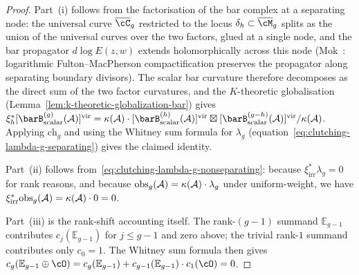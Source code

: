 \begin{proof}
Part~(i) follows from the factorisation of the bar complex at a
separating node: the universal curve $\overline{\cC}_g$ restricted
to the locus $\delta_h \subset \overline{\cM}_g$ splits as the
union of the universal curves over the two factors, glued at a
single node, and the bar propagator $d\!\log E(z,w)$ extends
holomorphically across this node
(Mok~\cite{Mok25}: logarithmic Fulton--MacPherson compactification
preserves the propagator along separating boundary divisors). The
scalar bar curvature therefore decomposes as the direct sum of the
two factor curvatures, and the $K$-theoretic globalisation
(Lemma~\ref{lem:k-theoretic-globalization-bar}) gives
$\xi_h^*[\barB^{(g)}_{\mathrm{scalar}}(\cA)]^{\mathrm{vir}}
= \kappa(\cA)\cdot[\barB^{(h)}_{\mathrm{scalar}}(\cA)]^{\mathrm{vir}}
\boxtimes
[\barB^{(g-h)}_{\mathrm{scalar}}(\cA)]^{\mathrm{vir}}/\kappa(\cA)$.
Applying $\mathrm{ch}_g$ and using the Whitney sum formula for
$\lambda_g$ (equation~\eqref{eq:clutching-lambda-g-separating}) gives the
claimed identity.

Part~(ii) follows from~\eqref{eq:clutching-lambda-g-nonseparating}: because
$\xi_{\mathrm{irr}}^*\lambda_g = 0$ for rank reasons, and because
$\mathrm{obs}_g(\mathcal{A}) = \kappa(\mathcal{A})\cdot\lambda_g$ under
uniform-weight, we have
$\xi_{\mathrm{irr}}^*\mathrm{obs}_g(\mathcal{A}) = \kappa(\mathcal{A})\cdot 0 = 0$.

Part~(iii) is the rank-shift accounting itself. The rank-$(g-1)$
summand $\mathbb{E}_{g-1}$ contributes
$c_j(\mathbb{E}_{g-1})$ for $j \leq g-1$ and zero above; the trivial
rank-$1$ summand contributes only $c_0 = 1$. The Whitney sum
formula then gives
$c_g(\mathbb{E}_{g-1}\oplus\cO)
= c_g(\mathbb{E}_{g-1}) + c_{g-1}(\mathbb{E}_{g-1})\cdot c_1(\cO) = 0$.
\end{proof}

